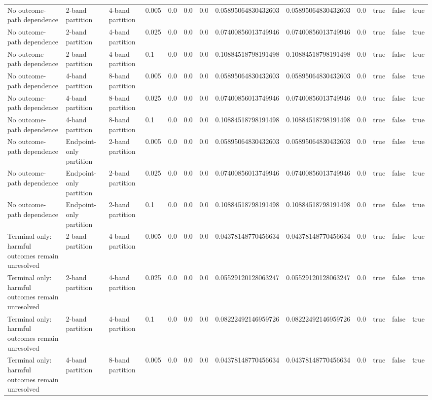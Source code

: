 \begin{tabular}{lllllllllllll}
No outcome-path dependence & 2-band partition & 4-band partition & 0.005 & 0.0 & 0.0 & 0.0 & 0.05895064830432603 & 0.05895064830432603 & 0.0 & true & false & true \\
No outcome-path dependence & 2-band partition & 4-band partition & 0.025 & 0.0 & 0.0 & 0.0 & 0.07400856013749946 & 0.07400856013749946 & 0.0 & true & false & true \\
No outcome-path dependence & 2-band partition & 4-band partition & 0.1 & 0.0 & 0.0 & 0.0 & 0.10884518798191498 & 0.10884518798191498 & 0.0 & true & false & true \\
No outcome-path dependence & 4-band partition & 8-band partition & 0.005 & 0.0 & 0.0 & 0.0 & 0.05895064830432603 & 0.05895064830432603 & 0.0 & true & false & true \\
No outcome-path dependence & 4-band partition & 8-band partition & 0.025 & 0.0 & 0.0 & 0.0 & 0.07400856013749946 & 0.07400856013749946 & 0.0 & true & false & true \\
No outcome-path dependence & 4-band partition & 8-band partition & 0.1 & 0.0 & 0.0 & 0.0 & 0.10884518798191498 & 0.10884518798191498 & 0.0 & true & false & true \\
No outcome-path dependence & Endpoint-only partition & 2-band partition & 0.005 & 0.0 & 0.0 & 0.0 & 0.05895064830432603 & 0.05895064830432603 & 0.0 & true & false & true \\
No outcome-path dependence & Endpoint-only partition & 2-band partition & 0.025 & 0.0 & 0.0 & 0.0 & 0.07400856013749946 & 0.07400856013749946 & 0.0 & true & false & true \\
No outcome-path dependence & Endpoint-only partition & 2-band partition & 0.1 & 0.0 & 0.0 & 0.0 & 0.10884518798191498 & 0.10884518798191498 & 0.0 & true & false & true \\
Terminal only: harmful outcomes remain unresolved & 2-band partition & 4-band partition & 0.005 & 0.0 & 0.0 & 0.0 & 0.04378148770456634 & 0.04378148770456634 & 0.0 & true & false & true \\
Terminal only: harmful outcomes remain unresolved & 2-band partition & 4-band partition & 0.025 & 0.0 & 0.0 & 0.0 & 0.05529120128063247 & 0.05529120128063247 & 0.0 & true & false & true \\
Terminal only: harmful outcomes remain unresolved & 2-band partition & 4-band partition & 0.1 & 0.0 & 0.0 & 0.0 & 0.08222492146959726 & 0.08222492146959726 & 0.0 & true & false & true \\
Terminal only: harmful outcomes remain unresolved & 4-band partition & 8-band partition & 0.005 & 0.0 & 0.0 & 0.0 & 0.04378148770456634 & 0.04378148770456634 & 0.0 & true & false & true \\

\end{tabular}
